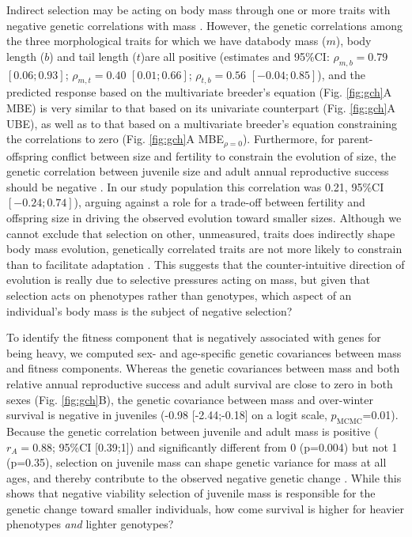 Indirect selection may be acting on body mass through one or more traits with negative genetic correlations with mass \parencite{Lande1983,Morrissey2012constraints}. However, the genetic correlations among the three morphological traits for which we have data\textemdash body mass ($m$), body length ($b$) and tail length ($t$)\textemdash are all positive (estimates and 95\%CI: $\rho_{m,b}=0.79$ $[0.06;0.93]$; $\rho_{m,t}=0.40$ $[0.01;0.66]$; $\rho_{t,b}=0.56$ $[-0.04;0.85]$), and the predicted response based on the multivariate breeder's equation (Fig. \ref{fig:gch}A MBE) is very similar to that based on its univariate counterpart (Fig. \ref{fig:gch}A UBE), as well as to that based on a multivariate breeder's equation constraining the correlations to zero (Fig. \ref{fig:gch}A MBE$_{\rho=0}$). Furthermore, for parent-offspring conflict between size and fertility to constrain the evolution of size, the genetic correlation between juvenile size and adult annual reproductive success should be negative \parencite{Rollinson2015b}. In our study population this correlation was 0.21, 95\%CI $[-0.24;0.74]$), arguing against a role for a trade-off between fertility and offspring size in driving the observed evolution toward smaller sizes. Although we cannot exclude that selection on other, unmeasured, traits does indirectly shape body mass evolution,  genetically correlated traits are not more likely to constrain than to facilitate adaptation \parencite{Agrawal2009}. This suggests that the counter-intuitive direction of evolution is really due to selective pressures acting on mass, but given that selection acts on phenotypes rather than genotypes, which aspect of an individual's body mass is the subject of negative selection? 

To identify the fitness component that is negatively associated with genes for being heavy, we computed sex- and age-specific genetic covariances between mass and fitness components. Whereas the genetic covariances between mass and both relative annual reproductive success and adult survival are close to zero in both sexes (Fig. \ref{fig:gch}B), the genetic covariance between mass and over-winter survival is negative in juveniles (-0.98 [-2.44;-0.18] on a logit scale, $p_\mathrm{MCMC}$=0.01). Because the genetic correlation between juvenile and adult mass is positive ($r_A=0.88$; 95\%CI [0.39;1]) and significantly different from 0 (p=0.004) but not 1 (p=0.35), selection on juvenile mass can shape genetic variance for mass at all ages, and thereby contribute to the observed negative genetic change \parencite{Chevin2015a}. While this shows that negative viability selection of juvenile mass is responsible for the genetic change toward smaller individuals, how come survival is higher for heavier phenotypes \emph{and} lighter genotypes? 


